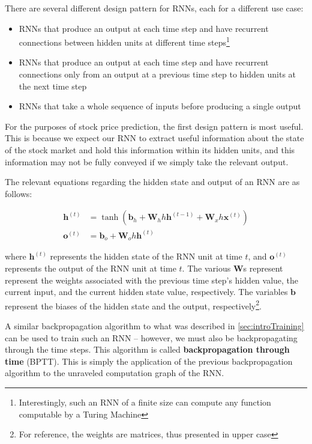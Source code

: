 \documentclass[12pt,a4paper,twoside,openright]{report}
\renewcommand{\vec}[1]{\mathbf{#1}}
\begin{document}
There are several different design pattern for RNNs, each for a different use case:
\begin{itemize}
	\item
	RNNs that produce an output at each time step and have recurrent connections between hidden units
	at different time steps\footnote{Interestingly, such an RNN of a finite size can compute any function computable 
	by a Turing Machine\cite{Goodfellow-et-al-2016}}
	
	\item
	RNNs that produce an output at each time step and have recurrent connections only from an output
	at a previous time step to hidden units at the next time step
	
	\item
	RNNs that take a whole sequence of inputs before producing a single output
\end{itemize}

For the purposes of stock price prediction, the first design pattern is most useful. This is because
we expect our RNN to extract useful information about the state of the stock market and hold this
information within its hidden units, and this information may not be fully conveyed if we simply 
take the relevant output.

The relevant equations regarding the hidden state and output of an RNN are as follows:

\begin{align}
\vec{h}^{(t)} &= \tanh(\vec{b}_h + \vec{W}_hh\vec{h}^{(t-1)} + \vec{W}_xh\vec{x}^{(t)})\\
\vec{o}^{(t)} &= \vec{b}_o + \vec{W}_oh\vec{h}^{(t)}
\end{align}

where $\vec{h}^{(t)}$ represents the hidden state of the RNN unit at time $t$,
and $\vec{o}^{(t)}$ represents the output of the RNN unit at time $t$. The various
$\vec{W}$s represent represent the weights associated with the previous 
time step's hidden value, the current input, and the current hidden state value, respectively.
The variables $\vec{b}$ represent the biases of the hidden state and the
output, respectively\footnote{For reference, the weights are matrices, thus presented in upper case}.

A similar backpropagation algorithm to what was described in \cref{sec:introTraining} can be used
to train such an RNN -- however, we must also be backpropagating through the time steps. This algorithm
is called \textbf{backpropagation through time} (BPTT). This is simply the application of the
previous backpropagation algorithm to the unraveled computation graph of the RNN.
\end{document}
